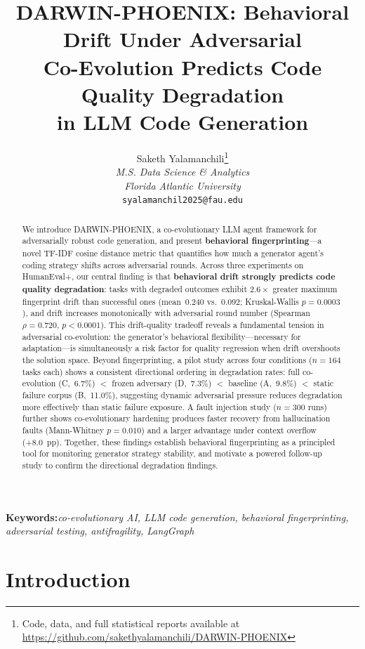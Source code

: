 \documentclass[11pt,letterpaper]{article}
\title{%
  \textbf{DARWIN-PHOENIX: Behavioral Drift Under Adversarial\\
  Co-Evolution Predicts Code Quality Degradation\\
  in LLM Code Generation}%
}
\author{%
  Saketh Yalamanchili\thanks{%
    Code, data, and full statistical reports available at
    \url{https://github.com/sakethyalamanchili/DARWIN-PHOENIX}}\\[2pt]
  \textit{M.S. Data Science \& Analytics}\\
  \textit{Florida Atlantic University}\\[2pt]
  \texttt{syalamanchil2025@fau.edu}%
}
\date{}
\providecommand{\keywords}[1]{%
  \vspace{6pt}\noindent\textbf{Keywords:}\enspace\textit{#1}\vspace{2pt}}
\begin{document}
\maketitle
\thispagestyle{empty}

\begin{abstract}
We introduce DARWIN-PHOENIX, a co-evolutionary LLM agent framework for
adversarially robust code generation, and present \textbf{behavioral
fingerprinting}---a novel TF-IDF cosine distance metric that quantifies
how much a generator agent's coding strategy shifts across adversarial
rounds.
Across three experiments on HumanEval+, our central finding is that
\textbf{behavioral drift strongly predicts code quality degradation}:
tasks with degraded outcomes exhibit $2.6\times$ greater maximum
fingerprint drift than successful ones (mean~0.240 vs.~0.092;
Kruskal-Wallis $p=0.0003$), and drift increases monotonically with
adversarial round number (Spearman $\rho=0.720$, $p<0.0001$).
This drift-quality tradeoff reveals a fundamental tension in adversarial
co-evolution: the generator's behavioral flexibility---necessary for
adaptation---is simultaneously a risk factor for quality regression when
drift overshoots the solution space.
Beyond fingerprinting, a pilot study across four conditions
($n=164$ tasks each) shows a consistent directional ordering in
degradation rates: full co-evolution (C,~6.7\%) $<$ frozen adversary
(D,~7.3\%) $<$ baseline (A,~9.8\%) $<$ static failure corpus
(B,~11.0\%), suggesting dynamic adversarial pressure reduces degradation
more effectively than static failure exposure.
A fault injection study ($n=300$ runs) further shows co-evolutionary
hardening produces faster recovery from hallucination faults
(Mann-Whitney $p=0.010$) and a larger advantage under context overflow
(+8.0~pp).
Together, these findings establish behavioral fingerprinting as a
principled tool for monitoring generator strategy stability, and motivate
a powered follow-up study to confirm the directional degradation
findings.
\end{abstract}

\keywords{co-evolutionary AI, LLM code generation, behavioral fingerprinting,
adversarial testing, antifragility, LangGraph}

\section{Introduction}
\end{document}
